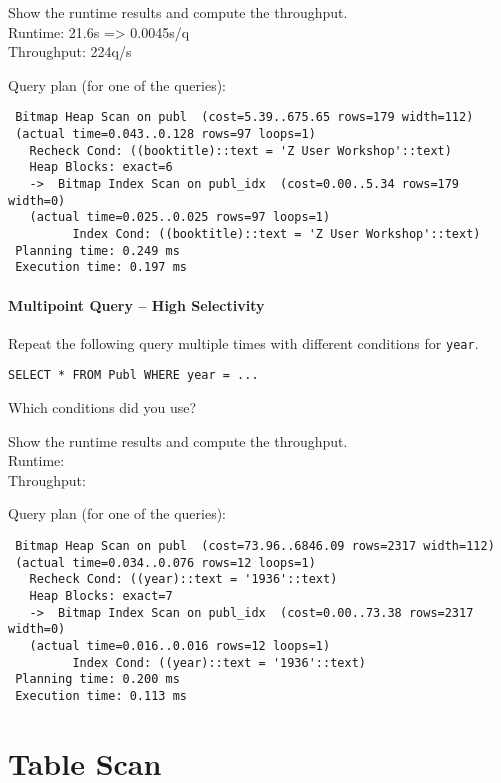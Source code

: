 \documentclass[11pt]{scrartcl}
\begin{document}
\smallskip\noindent
Show the runtime results and compute the throughput.\\
Runtime: 21.6s => 0.0045s/q\\
Throughput: 224q/s

\smallskip\noindent
Query plan (for one of the queries):
{\small
\begin{verbatim}
 Bitmap Heap Scan on publ  (cost=5.39..675.65 rows=179 width=112)
 (actual time=0.043..0.128 rows=97 loops=1)
   Recheck Cond: ((booktitle)::text = 'Z User Workshop'::text)
   Heap Blocks: exact=6
   ->  Bitmap Index Scan on publ_idx  (cost=0.00..5.34 rows=179 width=0)
   (actual time=0.025..0.025 rows=97 loops=1)
         Index Cond: ((booktitle)::text = 'Z User Workshop'::text)
 Planning time: 0.249 ms
 Execution time: 0.197 ms
\end{verbatim}
}


\paragraph{Multipoint Query -- High Selectivity}

Repeat the following query multiple times with different conditions for {\tt year}.

{\small
\begin{verbatim}
SELECT * FROM Publ WHERE year = ...
\end{verbatim}
}

\noindent
Which conditions did you use?

\smallskip\noindent
Show the runtime results and compute the throughput.\\
Runtime: \\
Throughput: 

\smallskip\noindent
Query plan (for one of the queries):
{\small
\begin{verbatim}
 Bitmap Heap Scan on publ  (cost=73.96..6846.09 rows=2317 width=112)
 (actual time=0.034..0.076 rows=12 loops=1)
   Recheck Cond: ((year)::text = '1936'::text)
   Heap Blocks: exact=7
   ->  Bitmap Index Scan on publ_idx  (cost=0.00..73.38 rows=2317 width=0)
   (actual time=0.016..0.016 rows=12 loops=1)
         Index Cond: ((year)::text = '1936'::text)
 Planning time: 0.200 ms
 Execution time: 0.113 ms
\end{verbatim}
}


\section{Table Scan}
\end{document}
